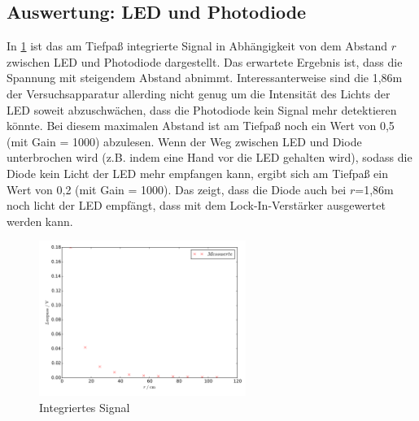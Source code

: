 \newpage

\subsection{Auswertung: LED und Photodiode}



In \ref{fig:plot4} ist das am Tiefpaß integrierte Signal in Abhängigkeit von
dem Abstand $r$ zwischen LED und Photodiode dargestellt. Das erwartete Ergebnis
ist, dass die Spannung mit steigendem Abstand abnimmt. Interessanterweise
sind die 1,86m der Versuchsapparatur allerding nicht genug um die Intensität
des Lichts der LED soweit abzuschwächen, dass die Photodiode kein Signal
mehr detektieren könnte. Bei diesem maximalen Abstand ist am Tiefpaß noch ein
Wert von 0,5 (mit Gain = 1000) abzulesen. Wenn der Weg zwischen LED und
Diode unterbrochen wird (z.B. indem eine Hand vor die LED gehalten wird),
sodass die Diode kein Licht der LED mehr empfangen kann, ergibt sich am
Tiefpaß ein Wert von 0,2 (mit Gain = 1000). Das zeigt, dass die Diode auch
bei $r$=1,86m noch licht der LED empfängt, dass mit dem Lock-In-Verstärker
ausgewertet werden kann.
\begin{figure}
  \centering
  \includegraphics[keepaspectratio, width=0.6\textwidth]{plot4.pdf}
  \caption{Integriertes Signal}
  \label{fig:plot4}
\end{figure}
